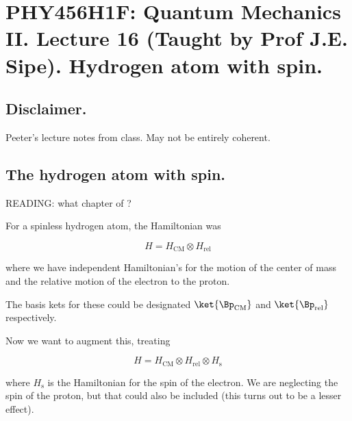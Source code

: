 
%

\chapter{PHY456H1F: Quantum Mechanics II.  Lecture 16 (Taught by Prof J.E. Sipe).  Hydrogen atom with spin.}
\label{chap:qmTwoL16}
{}
\date{Nov 2, 2011}

\beginArtWithToc


\section{Disclaimer.}

Peeter's lecture notes from class.  May not be entirely coherent.

\section{The hydrogen atom with spin.}

READING: what chapter of \cite{desai2009quantum} ?

For a spinless hydrogen atom, the Hamiltonian was

\begin{equation}\label{eqn:qmTwoL16:10}
H = H_{\text{CM}} \otimes H_{\text{rel}}
\end{equation}

where we have independent Hamiltonian's for the motion of the center of mass and the relative motion of the electron to the proton.

The basis kets for these could be designated $\ket{\Bp_\text{CM}}$ and $\ket{\Bp_\text{rel}}$ respectively.

Now we want to augment this, treating

\begin{equation}\label{eqn:qmTwoL16:30}
H = H_{\text{CM}} \otimes H_{\text{rel}} \otimes H_{\text{s}}
\end{equation}

where $H_{\text{s}}$ is the Hamiltonian for the spin of the electron.  We are neglecting the spin of the proton, but that could also be included (this turns out to be a lesser effect).

